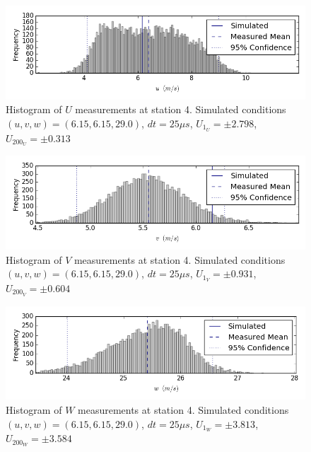 \begin{figure}[H]
\centering
\includegraphics[width=6in]{figs/Ely_May28th04001/uncertainty_Ely_May28th04001_U}
\caption{Histogram of $U$ measurements at station 4. Simulated conditions $(u,v,w)=(6.15, 6.15, 29.0)$, $dt=25 \mu s$, $U_1_U=\pm 2.798$, $U_200_U=\pm 0.313$}
\label{fig:uncertainty_Ely_May28th04001_U}
\end{figure}


\begin{figure}[H]
\centering
\includegraphics[width=6in]{figs/Ely_May28th04001/uncertainty_Ely_May28th04001_V}
\caption{Histogram of $V$ measurements at station 4. Simulated conditions $(u,v,w)=(6.15, 6.15, 29.0)$, $dt=25 \mu s$, $U_1_V=\pm 0.931$, $U_200_V=\pm 0.604$}
\label{fig:uncertainty_Ely_May28th04001_V}
\end{figure}


\begin{figure}[H]
\centering
\includegraphics[width=6in]{figs/Ely_May28th04001/uncertainty_Ely_May28th04001_W}
\caption{Histogram of $W$ measurements at station 4. Simulated conditions $(u,v,w)=(6.15, 6.15, 29.0)$, $dt=25 \mu s$, $U_1_W=\pm 3.813$, $U_200_W=\pm 3.584$}
\label{fig:uncertainty_Ely_May28th04001_W}
\end{figure}


